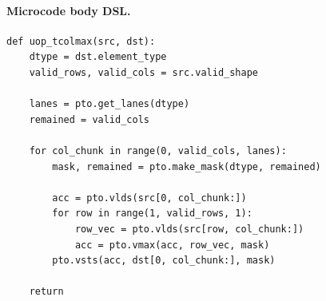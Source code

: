 \paragraph{Microcode body DSL.}
\begin{lstlisting}[style=ptocode]
def uop_tcolmax(src, dst):
    dtype = dst.element_type
    valid_rows, valid_cols = src.valid_shape

    lanes = pto.get_lanes(dtype)
    remained = valid_cols

    for col_chunk in range(0, valid_cols, lanes):
        mask, remained = pto.make_mask(dtype, remained)

        acc = pto.vlds(src[0, col_chunk:])
        for row in range(1, valid_rows, 1):
            row_vec = pto.vlds(src[row, col_chunk:])
            acc = pto.vmax(acc, row_vec, mask)
        pto.vsts(acc, dst[0, col_chunk:], mask)

    return
\end{lstlisting}
\Needspace{0.34\textheight}
